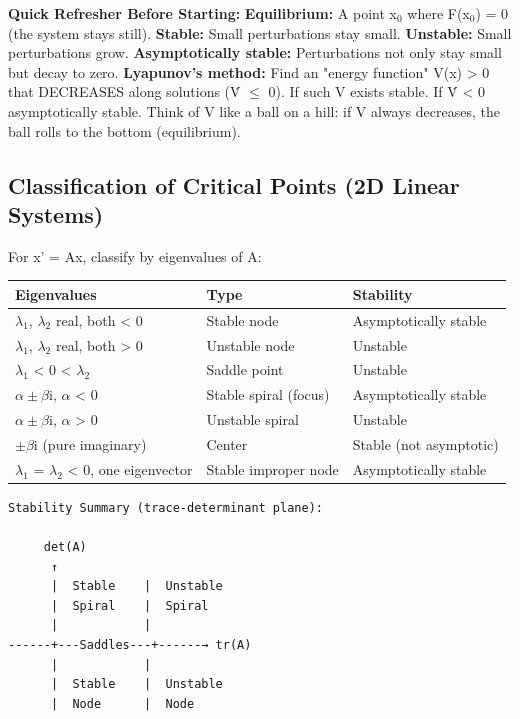 \documentclass[12pt,a4paper,openany]{book}
\begin{document}
{{\begin{prereqbox}
 \textbf{Quick Refresher Before Starting:}
\textbf{Equilibrium:} A point x$_0$ where F(x$_0$) = 0 (the system stays still).
\textbf{Stable:} Small perturbations stay small. \textbf{Unstable:} Small perturbations grow.
\textbf{Asymptotically stable:} Perturbations not only stay small but decay to zero.
\textbf{Lyapunov's method:} Find an "energy function" V(x) > 0 that DECREASES along solutions (V̇ $\leq$ 0).
If such V exists  stable. If V̇ < 0  asymptotically stable.
Think of V like a ball on a hill: if V always decreases, the ball rolls to the bottom (equilibrium).
\end{prereqbox}


\subsection{Classification of Critical Points (2D Linear Systems)}

For x' = Ax, classify by eigenvalues of A:

\begin{center}
\begin{tabular}{|l|l|l|}
\hline
\textbf{Eigenvalues} & \textbf{Type} & \textbf{Stability} \\
\hline
$\lambda_1$, $\lambda_2$ real, both < 0 & Stable node & Asymptotically stable \\
\hline
$\lambda_1$, $\lambda_2$ real, both > 0 & Unstable node & Unstable \\
\hline
$\lambda_1$ < 0 < $\lambda_2$ & Saddle point & Unstable \\
\hline
$\alpha\pm\beta$i, $\alpha$ < 0 & Stable spiral (focus) & Asymptotically stable \\
\hline
$\alpha\pm\beta$i, $\alpha$ > 0 & Unstable spiral & Unstable \\
\hline
$\pm\beta$i (pure imaginary) & Center & Stable (not asymptotic) \\
\hline
$\lambda_1$ = $\lambda_2$ < 0, one eigenvector & Stable improper node & Asymptotically stable \\
\hline
\end{tabular}
\end{center}

\begin{verbatim}
Stability Summary (trace-determinant plane):

     det(A)
      ↑
      |  Stable    |  Unstable
      |  Spiral    |  Spiral
      |            |
------+---Saddles---+------→ tr(A)
      |            |
      |  Stable    |  Unstable
      |  Node      |  Node
\end{verbatim}

}}
\end{document}
